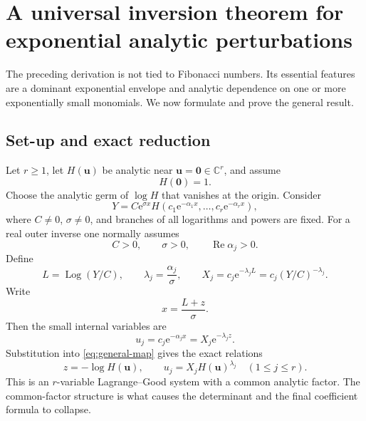 \documentclass[11pt,oneside]{article}
\theoremstyle{plain}
\theoremstyle{definition}
\theoremstyle{remark}
\newcommand{\e}{\mathrm{e}}
\newcommand{\C}{\mathbb{C}}
\newcommand{\Real}{\operatorname{Re}}
\newcommand{\Log}{\operatorname{Log}}
\begin{document}
\section{A universal inversion theorem for exponential analytic perturbations}
\label{sec:general-theorem}

The preceding derivation is not tied to Fibonacci numbers.  Its essential
features are a dominant exponential envelope and analytic dependence on one or
more exponentially small monomials.  We now formulate and prove the general
result.

\subsection{Set-up and exact reduction}

Let \(r\ge1\), let \(H(\bm u)\) be analytic near
\(\bm u=\bm0\in\C^r\), and assume
\begin{equation}
 H(\bm0)=1.
 \label{eq:H0-general}
\end{equation}
Choose the analytic germ of \(\log H\) that vanishes at the origin.  Consider
\begin{equation}
 Y=C\e^{\sigma x}
 H\!\left(c_1\e^{-\alpha_1x},\ldots,
          c_r\e^{-\alpha_rx}\right),
 \label{eq:general-map}
\end{equation}
where \(C\ne0\), \(\sigma\ne0\), and branches of all logarithms and powers
are fixed.  For a real outer inverse one normally assumes
\begin{equation}
 C>0,
 \qquad \sigma>0,
 \qquad \Real\alpha_j>0.
 \label{eq:real-general-assumptions}
\end{equation}
Define
\begin{equation}
 L=\Log(Y/C),
 \qquad
 \lambda_j=\frac{\alpha_j}{\sigma},
 \qquad
 X_j=c_j\e^{-\lambda_jL}
     =c_j(Y/C)^{-\lambda_j}.
 \label{eq:general-scaled-vars}
\end{equation}
Write
\begin{equation}
 x=\frac{L+z}{\sigma}.
 \label{eq:general-x-z}
\end{equation}
Then the small internal variables are
\begin{equation}
 u_j=c_j\e^{-\alpha_jx}
 =X_j\e^{-\lambda_jz}.
 \label{eq:general-u}
\end{equation}
Substitution into \eqref{eq:general-map} gives the exact relations
\begin{equation}
 z=-\log H(\bm u),
 \qquad
 u_j=X_jH(\bm u)^{\lambda_j}
 \quad(1\le j\le r).
 \label{eq:general-Good-system}
\end{equation}
This is an \(r\)-variable Lagrange--Good system with a common analytic factor.
The common-factor structure is what causes the determinant and the final
coefficient formula to collapse.
\end{document}
